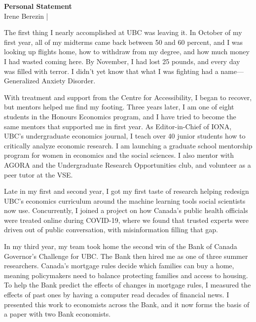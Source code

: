 \documentclass[12pt,letterpaper]{article}
\begin{document}
\begin{center}
  {\large\bfseries Personal Statement}\\[0.3ex]
  Irene Berezin \quad|
\end{center}
\vspace{1ex}
\setlength{\parskip}{0.8em}



The first thing I nearly accomplished at UBC was leaving it. In October of my first year, all of my midterms came back between 50 and 60 percent, and I was looking up flights home, how to withdraw from my degree, and how much money I had wasted coming here. By November, I had lost 25 pounds, and every day was filled with terror. I didn't yet know that what I was fighting had a name---Generalized Anxiety Disorder.

With treatment and support from the Centre for Accessibility, I began to recover, but mentors helped me find my footing. Three years later, I am one of eight students in the Honours Economics program, and I have tried to become the same mentors that supported me in first year. As Editor-in-Chief of IONA, UBC's undergraduate economics journal, I teach over 40 junior students how to critically analyze economic research. I am launching a graduate school mentorship program for women in economics and the social sciences. I also mentor with AGORA and the Undergraduate Research Opportunities club, and volunteer as a peer tutor at the VSE.

Late in my first and second year, I got my first taste of research helping redesign UBC's economics curriculum around the machine learning tools social scientists now use. Concurrently, I joined a project on how Canada's public health officials were treated online during COVID-19, where we found that trusted experts were driven out of public conversation, with misinformation filling that gap.


In my third year, my team took home the second win of the Bank of Canada Governor's Challenge for UBC. The Bank then hired me as one of three summer researchers. Canada's mortgage rules decide which families can buy a home, meaning policymakers need to balance protecting families and access to housing. To help the Bank predict the effects of changes in mortgage rules, I measured the effects of past ones by having a computer read decades of financial news. I presented this work to economists across the Bank, and it now forms the basis of a paper with two Bank economists.
\end{document}
